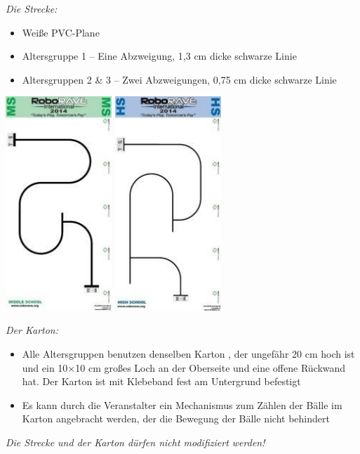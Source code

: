 \documentclass[a4paper,12pt]{article}
\begin{document}
\emph{Die Strecke:}
\begin{itemize}
	\item Weiße PVC-Plane
	\item Altersgruppe 1 – Eine Abzweigung, 1,3 cm dicke schwarze Linie
	\item Altersgruppen 2 \& 3 – Zwei Abzweigungen, 0,75 cm dicke schwarze Linie
\end{itemize}
\includegraphics[width=0.3\textwidth]{track_ms_lf.png}
\includegraphics[width=0.3\textwidth]{track_hs_lf.png}

\emph{Der Karton:}
\begin{itemize}
\item Alle Altersgruppen benutzen denselben Karton , der ungefähr 20 cm hoch ist und ein 10×10 cm großes Loch
an der Oberseite und eine offene Rückwand hat. Der Karton ist mit Klebeband fest am Untergrund befestigt
\item Es kann durch die Veranstalter ein Mechanismus zum Zählen der Bälle im Karton angebracht werden, der die
Bewegung der Bälle nicht behindert
\end{itemize}
\emph{Die Strecke und der Karton dürfen nicht modifiziert werden!}
\end{document}
